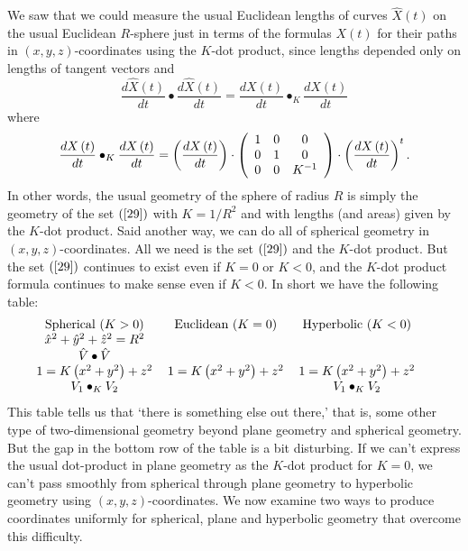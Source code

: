 We saw that we could measure the usual Euclidean lengths of curves $\hat
{X}\left(  t\right)  $ on the usual Euclidean $R$-sphere just in terms of the
formulas $X\left(  t\right)  $ for their paths in $\left(  x,y,z\right)
$-coordinates using the $K$-dot product, since lengths depended only on
lengths of tangent vectors and%
\[
\frac{d\hat{X}\left(  t\right)  }{dt}\bullet\frac{d\hat{X}\left(  t\right)
}{dt}=\frac{dX\left(  t\right)  }{dt}\bullet_{K}\frac{dX\left(  t\right)
}{dt}%
\]
where%
\[
\frac{dX\left(  t\right)  }{dt}\bullet_{K}\frac{dX\left(  t\right)  }%
{dt}=\left(  \frac{dX\left(  t\right)  }{dt}\right)  \cdot\left(
\begin{array}
[c]{ccc}%
1 & 0 & 0\\
0 & 1 & 0\\
0 & 0 & K^{-1}%
\end{array}
\right)  \cdot\left(  \frac{dX\left(  t\right)  }{dt}\right)  ^{t}.
\]
In other words, the usual geometry of the sphere of radius $R$ is simply the
geometry of the set $\left(  \ref{29}\right)  $ with $K=1/R^{2}$ and with
lengths (and areas) given by the $K$-dot product. Said another way, we can do
all of spherical geometry in $\left(  x,y,z\right)  $-coordinates. All we need
is the set $\left(  \ref{29}\right)  $ and the $K$-dot product. But the set
$\left(  \ref{29}\right)  $ continues to exist even if $K=0$ or $K<0$, and the
$K$-dot product formula continues to make sense even if $K<0$. In short we
have the following table:
\begin{equation}%
\begin{tabular}
[c]{ccc}%
Spherical ($K>0$) & Euclidean ($K=0$) & Hyperbolic ($K<0$)\\
$\hat{x}^{2}+\hat{y}^{2}+\hat{z}^{2}=R^{2}$ &  & \\
$\hat{V}\bullet\hat{V}$ &  & \\
$1=K\left(  x^{2}+y^{2}\right)  +z^{2}$ & $1=K\left(  x^{2}+y^{2}\right)
+z^{2}$ & $1=K\left(  x^{2}+y^{2}\right)  +z^{2}$\\
$V_{1}\bullet_{K}V_{2}$ &  & $V_{1}\bullet_{K}V_{2}$%
\end{tabular}
\ \ \ \ \label{66}%
\end{equation}
This table tells us that `there is something else out there,' that is, some
other type of two-dimensional geometry beyond plane geometry and spherical
geometry. But the gap in the bottom row of the table is a bit disturbing. If
we can't express the usual dot-product in plane geometry as the $K$-dot
product for $K=0$, we can't pass smoothly from spherical through plane
geometry to hyperbolic geometry using $\left(  x,y,z\right)  $-coordinates. We
now examine two ways to produce coordinates uniformly for spherical, plane and
hyperbolic geometry that overcome this difficulty.
